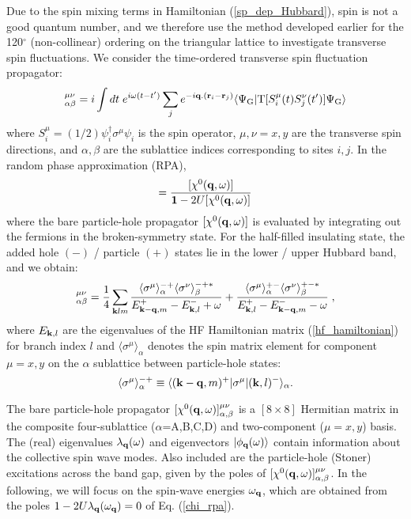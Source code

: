 \documentclass[aps,prb,fleqn,12pt,amsmath,amssymb]{revtex4}
\begin{document}
Due to the spin mixing terms in Hamiltonian (\ref{sp_dep_Hubbard}), spin is not a good quantum number, and we therefore use the method developed earlier for the 120$^\circ$ (non-collinear) ordering on the triangular lattice to investigate transverse spin fluctuations.\cite{tri} We consider the time-ordered transverse spin fluctuation propagator: 
\begin{equation}
[\chi ({\bf q},\omega)]^{\mu\nu} _{\alpha \beta} =
i \int dt  \; e^{i\omega (t-t')} \sum_j e^{-i{\bf q}.({\bf r}_i - {\bf r}_j)} 
\langle \Psi_{\rm G} |{\rm T}[S_i ^\mu (t) S_j ^\nu (t')]\Psi_{\rm G} \rangle
\end{equation}
where $S_i ^\mu = (1/2)\psi_i ^\dagger \sigma^\mu \psi_i$ is the spin operator, $\mu,\nu=x,y$ are the transverse spin directions, and $\alpha,\beta$ are the sublattice indices corresponding to sites $i,j$. In the random phase approximation (RPA),\cite{tri}  
\begin{equation}
[\chi ({\bf q},\omega)]  = \frac{[\chi^0 ({\bf q},\omega)]}
{{\bf 1} - 2U[\chi^0 ({\bf q},\omega)]}
\label{chi_rpa}
\end{equation}
where the bare particle-hole propagator $[\chi^0 ({\bf q},\omega)]$ is evaluated by integrating out the fermions in the broken-symmetry state. For the half-filled insulating state, the added hole $(-)$ / particle $(+)$ states lie in the lower / upper Hubbard band, and we obtain:
\begin{equation}
[\chi^0({\bf q},\omega)]^{\mu\nu} _{\alpha \beta} = \frac{1}{4}
\sum_{{\bf k}lm} \frac{\langle \sigma^\mu \rangle_\alpha ^{-+} \langle \sigma^\nu \rangle_\beta ^{-+*}}
{E_{{\bf k-q},m}^+ - E_{{\bf k},l}^- + \omega} 
+ 
\frac{\langle \sigma^\mu \rangle_\alpha ^{+-} \langle \sigma^\nu \rangle_\beta ^{+-*}}
{E_{{\bf k},l}^+ - E_{{\bf k-q},m}^- - \omega} \; ,
\end{equation}
where $E_{{\bf k},l}$ are the eigenvalues of the HF Hamiltonian matrix (\ref{hf_hamiltonian}) for  branch index $l$ and $\langle \sigma^\mu \rangle_\alpha$ denotes the spin matrix element for component $\mu = x,y$ on the $\alpha$ sublattice between particle-hole states:
\begin{equation}
\langle \sigma^\mu \rangle_\alpha ^{-+} \equiv
\langle ({\bf k-q},m)^+ |\sigma^\mu|({\bf k},l)^-\rangle_\alpha.
\end{equation}

The bare particle-hole propagator $[\chi^0({\bf q},\omega)]^{\mu\nu} _{\alpha,\beta}$ is a $[8 \times 8]$ Hermitian matrix in the composite four-sublattice ($\alpha$=A,B,C,D) and two-component ($\mu=x,y$) basis. The (real) eigenvalues $\lambda_{\bf q}(\omega)$ and eigenvectors $|\phi_{\bf q}(\omega)\rangle$  contain information about the collective spin wave modes. Also included are the particle-hole (Stoner) excitations across the band gap, given by the poles of $[\chi^0({\bf q},\omega)]^{\mu\nu} _{\alpha,\beta}$. In the following, we will focus on the spin-wave energies $\omega_{\bf q}$, which are obtained from the poles $1-2U\lambda_{\bf q}(\omega_{\bf q}) = 0$ of Eq. (\ref{chi_rpa}).
\end{document}
